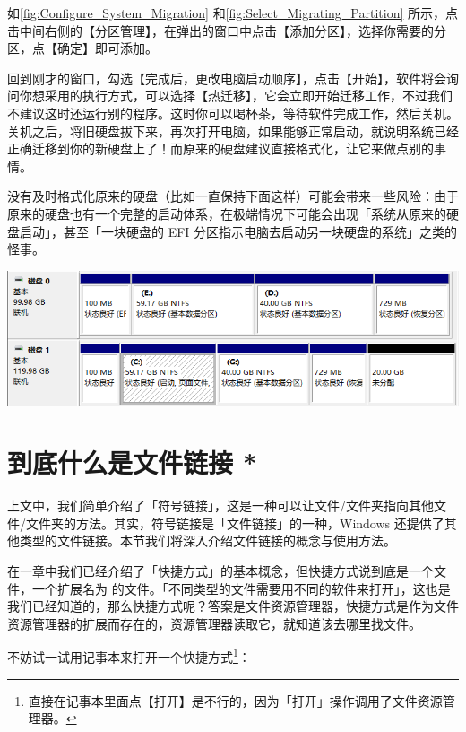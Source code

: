 {{{{如\autoref{fig:Configure_System_Migration} 和\autoref{fig:Select_Migrating_Partition} 所示，点击中间右侧的【分区管理】，在弹出的窗口中点击【添加分区】，选择你需要的分区，点【确定】即可添加。

回到刚才的窗口，勾选【完成后，更改电脑启动顺序】，点击【开始】，软件将会询问你想采用的执行方式，可以选择【热迁移】，它会立即开始迁移工作，不过我们不建议这时还运行别的程序。这时你可以喝杯茶，等待软件完成工作，然后关机。关机之后，将旧硬盘拔下来，再次打开电脑，如果能够正常启动，就说明系统已经正确迁移到你的新硬盘上了！而原来的硬盘建议直接格式化，让它来做点别的事情。

\begin{warning}
  没有及时格式化原来的硬盘（比如一直保持下面这样）可能会带来一些风险：由于原来的硬盘也有一个完整的启动体系，在极端情况下可能会出现「系统从原来的硬盘启动」，甚至「一块硬盘的 EFI 分区指示电脑去启动另一块硬盘的系统」之类的怪事。

  \begin{center}
    \includegraphics[width=.75\textwidth]{assets/advanced/Migration_Result.png}
    \label{fig:Migration_Result}
  \end{center}
\end{warning}

\section{到底什么是文件链接 *}

上文中，我们简单介绍了「符号链接」，这是一种可以让文件/文件夹指向其他文件/文件夹的方法。其实，符号链接是「文件链接」的一种，Windows 还提供了其他类型的文件链接。本节我们将深入介绍文件链接的概念与使用方法。

在一章中我们已经介绍了「快捷方式」的基本概念，但快捷方式说到底是一个文件，一个扩展名为  的文件。「不同类型的文件需要用不同的软件来打开」，这也是我们已经知道的，那么快捷方式呢？答案是文件资源管理器，快捷方式是作为文件资源管理器的扩展而存在的，资源管理器读取它，就知道该去哪里找文件。

不妨试一试用记事本来打开一个快捷方式\footnote{直接在记事本里面点【打开】是不行的，因为「打开」操作调用了文件资源管理器。}：

}}}}
